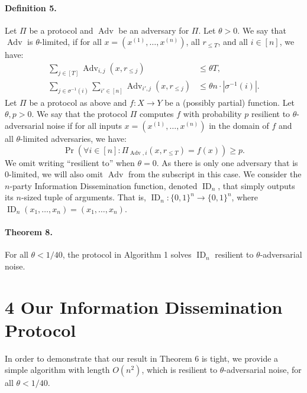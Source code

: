 \paragraph{Definition 5.} Let $\Pi$ be a protocol and $\operatorname{Adv}$ be an adversary for $\Pi$. Let $\theta>0$. We say that $\operatorname{Adv}$ is $\theta$-limited, if for all $x=(x^{(1)},\ldots,x^{(n)})$, all $r_{\le T}$, and all $i\in[n]$, we have:
\begin{align*}\sum_{j\in[T]}\operatorname{Adv}_{i,j}(x,r_{\le j})&\le\theta T,\\\sum_{j\in\sigma^{-1}(i)}\sum_{i'\in[n]}\operatorname{Adv}_{i',j}(x,r_{\le j})&\le\theta n\cdot|\sigma^{-1}(i)|.\end{align*}
Let $\Pi$ be a protocol as above and $f:X\to Y$ be a (possibly partial) function. Let $\theta,p>0$. We say that the protocol $\Pi$ computes $f$ with probability $p$ resilient to $\theta$-adversarial noise if for all inputs $x=(x^{(1)},\ldots,x^{(n)})$ in the domain of $f$ and all $\theta$-limited adversaries, we have:
\[\Pr(\forall i\in[n]:\Pi_{\operatorname{Adv},i}(x,r_{\le T})=f(x))\ge p.\]
We omit writing ``resilient to'' when $\theta=0$. As there is only one adversary that is 0-limited, we will also omit $\operatorname{Adv}$ from the subscript in this case.
We consider the $n$-party Information Dissemination function, denoted $\operatorname{ID}_n$, that simply outputs its $n$-sized tuple of arguments. That is, $\operatorname{ID}_n:\{0,1\}^n\to\{0,1\}^n$, where $\operatorname{ID}_n(x_1,\ldots,x_n)=(x_1,\ldots,x_n)$.
\paragraph{Theorem 8.} For all $\theta<1/40$, the protocol in Algorithm 1 solves $\operatorname{ID}_n$ resilient to $\theta$-adversarial noise.
\section*{4 Our Information Dissemination Protocol}
In order to demonstrate that our result in Theorem 6 is tight, we provide a simple algorithm with length $O(n^2)$, which is resilient to $\theta$-adversarial noise, for all $\theta<1/40$.

